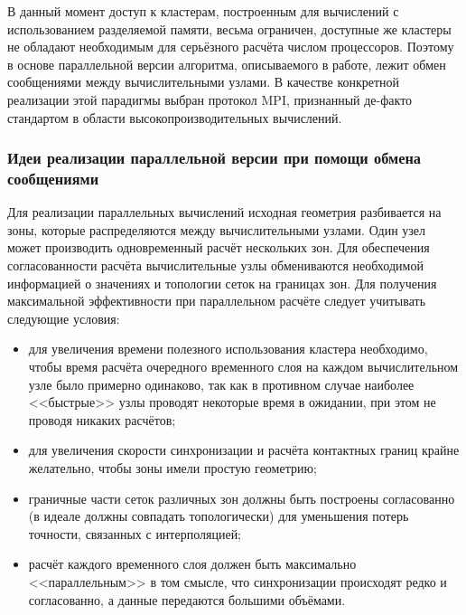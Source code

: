 В данный момент доступ к кластерам, построенным для вычислений с использованием
разделяемой памяти, весьма ограничен, доступные же кластеры не обладают
необходимым для серьёзного расчёта числом процессоров. Поэтому в основе
параллельной версии алгоритма, описываемого в работе, лежит обмен сообщениями
между вычислительными узлами. В качестве конкретной реализации этой парадигмы
выбран протокол MPI, признанный де-факто стандартом в области
высокопроизводительных вычислений.

\subsubsection{Идеи реализации параллельной версии при помощи обмена сообщениями}
Для реализации параллельных вычислений исходная геометрия разбивается на зоны, которые распределяются между вычислительными узлами. Один узел может производить одновременный расчёт нескольких зон. Для обеспечения согласованности расчёта вычислительные узлы обмениваются необходимой информацией о значениях и топологии сеток на границах зон. Для получения максимальной эффективности при параллельном расчёте следует учитывать следующие условия:
\begin{itemize}
	\item для увеличения времени полезного использования кластера необходимо, чтобы время расчёта очередного временного слоя на каждом вычислительном узле было примерно одинаково, так как в противном случае наиболее <<быстрые>> узлы проводят некоторые время в ожидании, при этом не проводя никаких расчётов;
	\item для увеличения скорости синхронизации и расчёта контактных границ крайне желательно, чтобы зоны имели простую геометрию;
	\item граничные части сеток различных зон должны быть построены согласованно (в идеале должны совпадать топологически) для уменьшения потерь точности, связанных с интерполяцией;
	\item расчёт каждого временного слоя должен быть максимально <<параллельным>> в том смысле, что синхронизации происходят редко и согласованно, а данные передаются большими объёмами.
\end{itemize}
